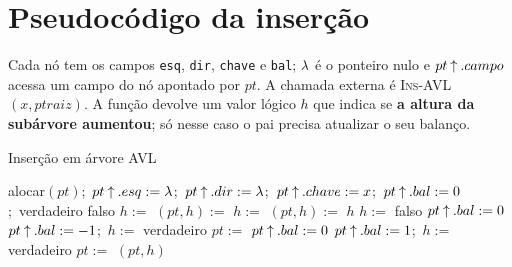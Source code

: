 \section{Pseudocódigo da inserção}\label{sec:avlpseudo}
Cada nó tem os campos \texttt{esq}, \texttt{dir}, \texttt{chave} e \texttt{bal}; $\lambda$ é o ponteiro nulo e $pt\mathbin{\uparrow}.campo$ acessa um campo do nó apontado por $pt$. A chamada externa é \textsc{Ins-AVL}$(x,ptraiz)$. A função devolve um valor lógico $h$ que indica se \textbf{a altura da subárvore aumentou}; só nesse caso o pai precisa atualizar o seu balanço.

\begin{pseudo}{Inserção em árvore AVL}
\begin{algorithmic}
  \State alocar$(pt)$;\ $pt\mathbin{\uparrow}.esq:=\lambda$;\ $pt\mathbin{\uparrow}.dir:=\lambda$;\ $pt\mathbin{\uparrow}.chave:=x$;\ $pt\mathbin{\uparrow}.bal:=0$
\EndProcedure
{} 
   \State {};\ \Return verdadeiro \EndIf
   \State \Return falso  \EndIf
    \State $h:=$ 
     \State $(pt,h):=$  \EndIf
  \Else
    \State $h:=$ 
     \State $(pt,h):=$  \EndIf
  \EndIf
  \State \Return $h$
\EndFunction
{}
  \State $h:=$ falso
     \State $pt\mathbin{\uparrow}.bal:=0$
     \State $pt\mathbin{\uparrow}.bal:=-1$;\ $h:=$ verdadeiro 
    \Else \State $pt:=$  
    \EndIf
  \Else
     \State $pt\mathbin{\uparrow}.bal:=0$
     \State $pt\mathbin{\uparrow}.bal:=1$;\ $h:=$ verdadeiro
    \Else \State $pt:=$ 
    \EndIf
  \EndIf
  \State \Return $(pt,h)$ 
\EndFunction
\end{algorithmic}
\end{pseudo}

